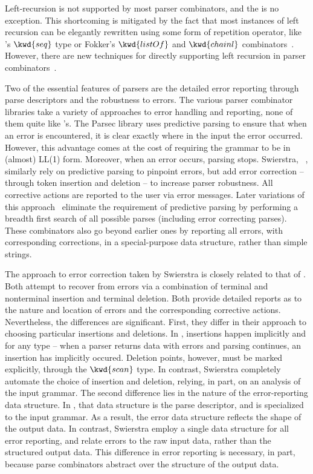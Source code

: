 Left-recursion is not supported by most parser combinators, and the \ddc{} is no exception. This shortcoming is mitigated by the fact that most instances of left recursion can be elegantly rewritten using some form of repetition operator, like \ddc{}'s $\kwd{seq}$ type or
Fokker's $\kwd{listOf}$ and $\kwd{chainl}$ combinators~\cite{fokker:functional-parsers}. However, there are new techniques for directly supporting left recursion in parser combinators~\cite{frost+:padl-pcombs}.

Two of the essential features of \ddc{} parsers are the detailed
error reporting through parse descriptors and the robustness to
errors. The various parser combinator libraries take a variety of
approaches to error handling and reporting, none of them quite like
\ddc{}'s. The Parsec library uses predictive parsing to ensure that
when an error is encountered, it is clear exactly where in the input
the error occurred. However, this advantage comes at the cost of
requiring the grammar to be in (almost) LL(1) form. Moreover, when an
error occurs, parsing stops. Swierstra,
\etal{}~\cite{swierstra+:deterministic-error-correcting}, similarly
rely on predictive parsing to pinpoint errors, but add error
correction -- through token insertion and deletion -- to increase
parser robustness. All corrective actions are reported to the user via
error messages. Later variations of this
approach~\cite{swierstra+:fast-error-correcting,swierstra:toys-parsing}
eliminate the requirement of predictive parsing by performing a
breadth first search of all possible parses (including error
correcting parses). These combinators also go beyond earlier ones by
reporting all errors, with corresponding corrections, in a
special-purpose data structure, rather than simple strings.

The approach to error correction taken by Swierstra \etal{} is closely
related to that of \ddc{}. Both attempt to recover 
from errors via a combination of terminal and nonterminal insertion
and terminal deletion. Both provide detailed reports as to the
nature and location of errors and the corresponding corrective
actions. Nevertheless, the differences are significant. First, they
differ in their approach to choosing particular insertions and
deletions. In \ddc{}, insertions happen implicitly and for any type --
when a parser returns data with errors and parsing continues, an
insertion has implicitly occured. Deletion points, however, must be
marked explicitly, through the $\kwd{scan}$ type. In contrast,
Swierstra \etal{} completely automate the choice of insertion and
deletion, relying, in part, on an analysis of the input grammar. The
second difference lies in the nature of the error-reporting data
structure. In \ddc{}, that data structure is the parse descriptor, and
is specialized to the input grammar. As a result, the error data
structure reflects the shape of the output data. In contrast,
Swierstra \etal{} employ a single data structure for all error
reporting, and relate errors to the raw input data, rather than the
structured output data. This difference in error reporting is
necessary, in part, because parse combinators abstract over the
structure of the output data.

